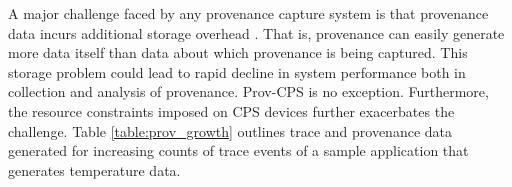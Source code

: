%



%
%
%
%
%

A major challenge faced by any provenance capture system is that provenance data incurs additional storage overhead \cite{issue_provenance}. That is, provenance can easily generate more data itself than data about which provenance is being captured. This storage problem could lead to rapid decline in system performance both in collection and analysis of provenance. Prov-CPS is no exception. Furthermore, the resource constraints imposed on CPS devices further exacerbates the challenge. Table \ref{table:prov_growth} outlines trace and provenance data generated for increasing counts of trace events of a sample application that generates temperature data. 


%


